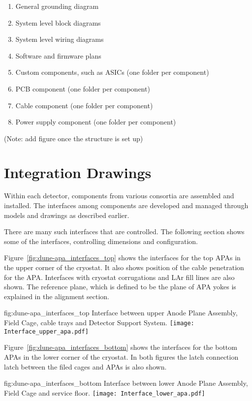 \begin{enumerate}
\begin{enumerate}
   \item General grounding diagram
   \item System level block diagrams
   \item System level wiring diagrams
   \item Software and firmware plans
   \item Custom components, such as ASICs (one folder per component)
   \item PCB component (one folder per component)
   \item Cable component (one folder per component)
   \item Power supply component (one folder per component)
 \end{enumerate}
\end{enumerate}
(Note: add figure once the  structure is set up)



\section{Integration Drawings}
\label{sec:fdsp-coord-integ-drawings}
Within each detector, components from various consortia are assembled
and installed. The interfaces among components are developed and
managed through models and drawings as described earlier.

There are many such interfaces that are controlled. The following
section shows some of the interfaces, controlling dimensions and
configuration.

Figure~\ref{fig:dune-apa_interfaces_top} shows the interfaces for the
top APAs in the upper corner of the cryostat. It also shows position
of the cable penetration for the APA. Interfaces with cryostat
corrugations and LAr fill lines are also shown. The reference plane,
which is defined to be the plane of APA yokes is explained in the
alignment section.
\begin{dunefigure}{fig:dune-apa_interfaces_top}
  {Interface between upper Anode Plane Assembly, Field Cage, cable
    trays and Detector Support System.}
  \texttt{[image: Interface\_upper\_apa.pdf]}
\end{dunefigure}

Figure~\ref{fig:dune-apa_interfaces_bottom} shows the interfaces for
the bottom APAs in the lower corner of the cryostat. In both figures
the latch connection latch between the filed cages and APAs is also
shown.
\begin{dunefigure}{fig:dune-apa_interfaces_bottom}
  {Interface between lower Anode Plane Assembly, Field Cage and
    service floor.}
  \texttt{[image: Interface\_lower\_apa.pdf]}
\end{dunefigure}

